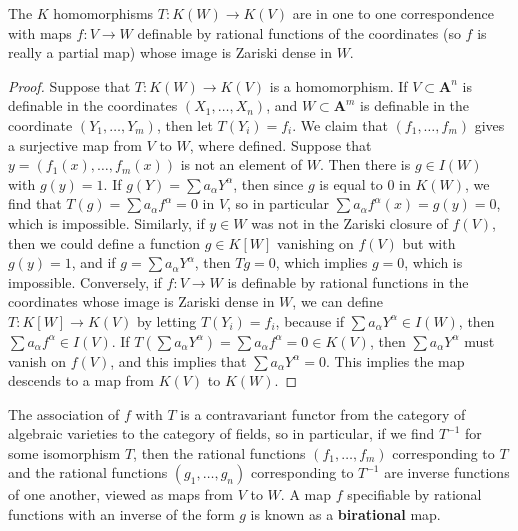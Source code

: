 \begin{theorem}
    The $K$ homomorphisms $T: K(W) \to K(V)$ are in one to one correspondence with maps $f: V \to W$ definable by rational functions of the coordinates (so $f$ is really a partial map) whose image is Zariski dense in $W$.
\end{theorem}
\begin{proof}
    Suppose that $T: K(W) \to K(V)$ is a homomorphism. If $V \subset \mathbf{A}^n$ is definable in the coordinates $(X_1, \dots, X_n)$, and $W \subset \mathbf{A}^m$ is definable in the coordinate $(Y_1, \dots, Y_m)$, then let $T(Y_i) = f_i$. We claim that $(f_1, \dots, f_m)$ gives a surjective map from $V$ to $W$, where defined. Suppose that $y = (f_1(x), \dots, f_m(x))$ is not an element of $W$. Then there is $g \in I(W)$ with $g(y) = 1$. If $g(Y) = \sum a_\alpha Y^\alpha$, then since $g$ is equal to 0 in $K(W)$, we find that $T(g) = \sum a_\alpha f^\alpha = 0$ in $V$, so in particular $\sum a_\alpha f^\alpha(x) = g(y) = 0$, which is impossible. Similarly, if $y \in W$ was not in the Zariski closure of $f(V)$, then we could define a function $g \in K[W]$ vanishing on $f(V)$ but with $g(y) = 1$, and if $g = \sum a_\alpha Y^\alpha$, then $Tg = 0$, which implies $g = 0$, which is impossible. Conversely, if $f: V \to W$ is definable by rational functions in the coordinates whose image is Zariski dense in $W$, we can define $T: K[W] \to K(V)$ by letting $T(Y_i) = f_i$, because if $\sum a_\alpha Y^\alpha \in I(W)$, then $\sum a_\alpha f^\alpha \in I(V)$. If $T(\sum a_\alpha Y^\alpha) = \sum a_\alpha f^\alpha = 0 \in K(V)$, then $\sum a_\alpha Y^\alpha$ must vanish on $f(V)$, and this implies that $\sum a_\alpha Y^\alpha = 0$. This implies the map descends to a map from $K(V)$ to $K(W)$.
\end{proof}

The association of $f$ with $T$ is a contravariant functor from the category of algebraic varieties to the category of fields, so in particular, if we find $T^{-1}$ for some isomorphism $T$, then the rational functions $(f_1, \dots, f_m)$ corresponding to $T$ and the rational functions $(g_1, \dots, g_n)$ corresponding to $T^{-1}$ are inverse functions of one another, viewed as maps from $V$ to $W$. A map $f$ specifiable by rational functions with an inverse of the form $g$ is known as a {\bf birational} map.


